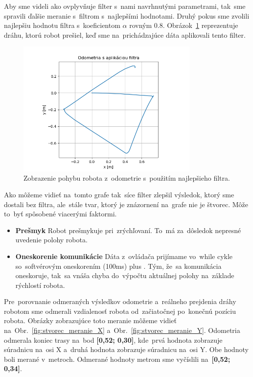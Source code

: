 Aby sme videli ako ovplyvňuje filter s~nami navrhnutými parametrami, tak~sme spravili ďalšie meranie s~filtrom
s~najlepšími hodnotami. Druhý pokus sme zvolili najlepšiu hodnotu filtra s~koeficientom $\alpha$ rovným 0.8.
Obrázok~\ref{fig:stvorecSFiltrom} reprezentuje dráhu, ktorú robot prešiel, keď sme na~prichádzajúce dáta
aplikovali tento filter.

\begin{figure}[!htbp]
	\begin{center}
		\includegraphics[width=0.8\textwidth]{img/stvorec_s_filtrom_3.png}
	\end{center}
	\caption{Zobrazenie pohybu robota z~odometrie s~použitím najlepšieho filtra.}
	\label{fig:stvorecSFiltrom}
\end{figure}

Ako môžeme vidieť na~tomto grafe tak~síce filter zlepšil výsledok, ktorý sme dostali bez filtra, ale~stále tvar, ktorý
je znázornení na~grafe nie je štvorec. Môže to~byť spôsobené viacerými faktormi.

\begin{itemize}
	\item \textbf{Prešmyk} Robot prešmykuje pri~zrýchľovaní. To~má za~dôsledok nepresné uvedenie polohy robota.
	\item \textbf{Oneskorenie komunikácie} Dáta z~ovládača prijímame vo~while cykle so~softvérovým oneskorením (100ms)
		plus \cite{timovyProjekt}. Tým, že~sa komunikácia oneskoruje, tak~sa vnáša chyba do~výpočtu aktuálnej polohy
		na~základe rýchlostí robota.
\end{itemize}

Pre~porovnanie odmeraných výsledkov odometrie a~reálneho prejdenia dráhy robotom sme odmerali vzdialenosť robota
od~začiatočnej po~konečnú pozíciu robota. Obrázky zobrazujúce toto meranie môžeme vidieť
na~Obr.~\ref{fig:stvorec_meranie_X} a~Obr.~\ref{fig:stvorec_meranie_Y}.
Odometria odmerala koniec trasy na~bod \textbf{[0,52; 0,30]}, kde~prvá hodnota zobrazuje súradnicu na~osi X a~druhá hodnota
zobrazuje súradnicu na~osi Y. Obe hodnoty boli merané v~metroch. Odmerané hodnoty metrom sme vyčíslili na~\textbf{[0,52; 0,34]}.


